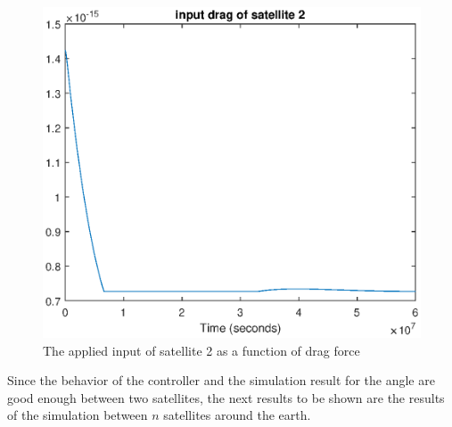 %
\begin{figure}[H]
	\centering
	\includegraphics[width=0.9\linewidth]
	{figures/input_drag_sat2.eps}
	\caption{The applied input of satellite 2 as a function of drag force  }
	\label{fig:distancecontrol4}
\end{figure}
%
Since the behavior of the controller and the simulation result for the angle are  good enough between two satellites, the next results to be shown are the results of the simulation between $n$ satellites around the earth. 

